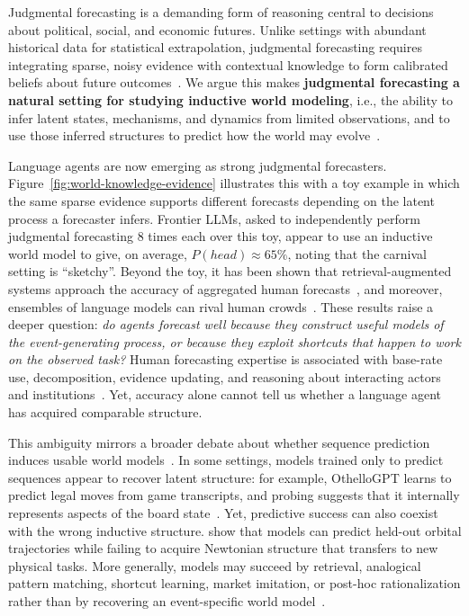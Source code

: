 \documentclass{article} %
\begin{document}
Judgmental forecasting is a demanding form of reasoning central to decisions about political, social, and economic futures.
Unlike settings with abundant historical data for statistical extrapolation, judgmental forecasting requires integrating sparse, noisy evidence with contextual knowledge to form calibrated beliefs about future outcomes~\citep{tetlock2016superforecasting,mellers2014psychological,lawrence2006judgmental}. We argue this makes \textbf{judgmental forecasting a natural setting for studying inductive world modeling}, i.e., the ability to infer latent states, mechanisms, and dynamics from limited observations, and to use those inferred structures to predict how the world may evolve~\citep{tenenbaum2006theory,griffiths2010probabilistic,tenenbaum2011mind,lake2017building}.


Language agents are now emerging as strong judgmental forecasters.
Figure~\ref{fig:world-knowledge-evidence} illustrates this with a toy example in which the same sparse evidence supports different forecasts depending on the latent process a forecaster infers.
Frontier LLMs, asked to independently perform judgmental forecasting 8 times each over this toy, appear to use an inductive world model to give, on average, $P(head)\approx65\%$, noting that the carnival setting is ``sketchy''.
Beyond the toy, it has been shown that retrieval-augmented systems approach the accuracy of aggregated human forecasts~\citep{halawi2024approaching}, and moreover, ensembles of language models can rival human crowds~\citep{schoenegger2024wisdom}.
These results raise a deeper question: \textit{do agents forecast well because they construct useful models of the event-generating process, or because they exploit shortcuts that happen to work on the observed task?}
Human forecasting expertise is associated with base-rate use, decomposition, evidence updating, and reasoning about interacting actors and institutions~\citep{tetlock2016superforecasting,mellers2014psychological}.
Yet, accuracy alone cannot tell us whether a language agent has acquired comparable structure.

This ambiguity mirrors a broader debate about whether sequence prediction induces usable world models~\citep{mitchell2023ai,andreas2022agent,ha2018world}.
In some settings, models trained only to predict sequences appear to recover latent structure: for example, OthelloGPT learns to predict legal moves from game transcripts, and probing suggests that it internally represents aspects of the board state~\citep{li2023emergent}.
Yet, predictive success can also coexist with the wrong inductive structure.
\citet{vafa2025foundation} show that models can predict held-out orbital trajectories while failing to acquire Newtonian structure that transfers to new physical tasks.
More generally, models may succeed by retrieval, analogical pattern matching, shortcut learning, market imitation, or post-hoc rationalization rather than by recovering an event-specific world model~\citep{khandelwal2020generalization,lewis2020retrieval,yasunaga2024large,geirhos2020shortcut,jacovi2020towards,turpin2023language}.
\end{document}
